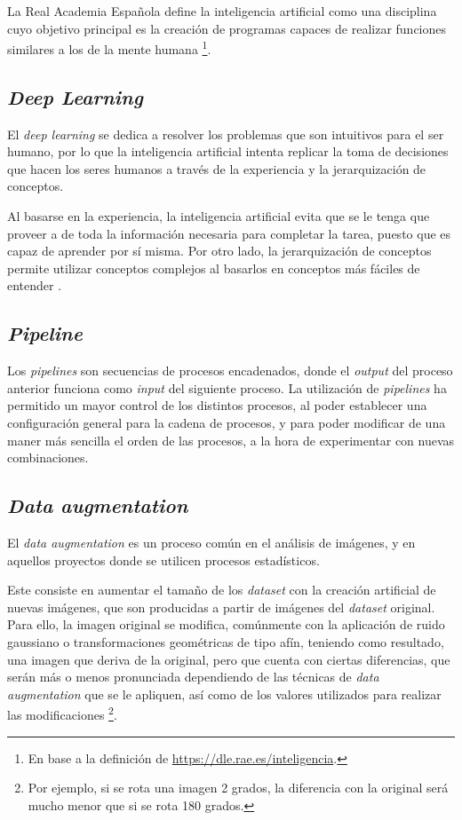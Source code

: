 La Real Academia Española define la inteligencia artificial como una disciplina cuyo objetivo principal es la creación de programas capaces de realizar funciones similares a los de la mente humana \footnote{En base a la definición de \url{https://dle.rae.es/inteligencia}.}.

\subsection{\textit{Deep Learning}}

El \textit{deep learning} se dedica a resolver los problemas que son intuitivos para el ser humano, por lo que la inteligencia artificial intenta replicar la toma de decisiones que hacen los seres humanos a través de la experiencia y la jerarquización de conceptos. 

Al basarse en la experiencia, la inteligencia artificial evita que se le tenga que proveer a de toda la información necesaria para completar la tarea, puesto que es capaz de aprender por sí misma. Por otro lado, la jerarquización de conceptos permite utilizar conceptos complejos 
al basarlos en conceptos más fáciles de entender \cite{Goodfellow-et-al-2016}.

\subsection{\textit{Pipeline}}

Los \textit{pipelines} son secuencias de procesos encadenados, donde el \textit{output} del proceso anterior funciona como \textit{input} del siguiente proceso. La utilización de \textit{pipelines} ha permitido un mayor control de los distintos procesos, al poder 
establecer una configuración general para la cadena de procesos, y para poder modificar de una maner más sencilla el orden de las procesos, a la hora de experimentar con nuevas combinaciones.

\subsection{\textit{Data augmentation}}\label{dataaugmentation}

El \textit{data augmentation} es un proceso común en el análisis de imágenes, y en aquellos proyectos donde se utilicen procesos estadísticos. 

Este consiste en aumentar el tamaño de los \textit{dataset} con la creación artificial de nuevas imágenes, que son producidas a partir de imágenes del \textit{dataset} original.
Para ello, la imagen original se modifica, comúnmente con la aplicación de ruido gaussiano o transformaciones geométricas de tipo afín, teniendo como resultado, una imagen que deriva de la original, pero que cuenta con ciertas diferencias, que serán más o menos pronunciada dependiendo de las técnicas 
de \textit{data augmentation} que se le apliquen, así como de los valores utilizados para realizar las modificaciones \footnote{Por ejemplo, si se rota una imagen 2 grados, la diferencia con la original será mucho menor que si se rota 180 grados.}.	

